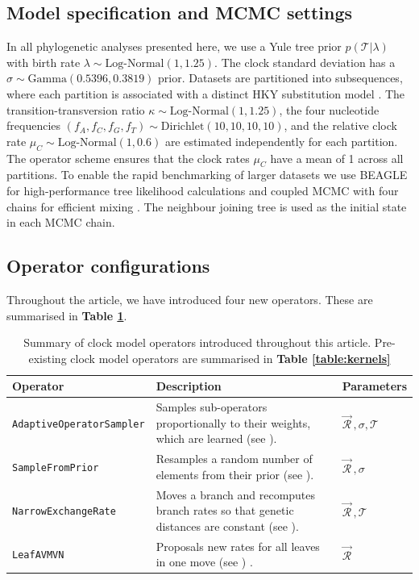 \documentclass[10pt,letterpaper]{article}
\begin{document}
\clearpage
\subsection*{Model specification and MCMC settings} \label{sect:methods}

In all phylogenetic analyses presented here, we use a Yule \cite{yule1925ii} tree prior $p(\mathcal{T}|\lambda)$ with birth rate $\lambda \sim \text{Log-Normal}(1,1.25)$.
The clock standard deviation has a $\sigma \sim \text{Gamma}(0.5396,0.3819)$ prior.
Datasets are partitioned into subsequences, where each partition is associated with a distinct HKY substitution model \cite{hasegawa1985dating}.
The transition-transversion ratio $\kappa \sim \text{Log-Normal}(1, 1.25)$, the four nucleotide frequencies $(f_A, f_C, f_G, f_T) \sim \text{Dirichlet}(10,10,10,10)$, and the relative clock rate $\mu_C \sim \text{Log-Normal}(1, 0.6)$ are estimated independently for each partition.
The operator scheme ensures that the clock rates $\mu_C$ have a mean of 1 across all partitions. 
To enable the rapid benchmarking of larger datasets we use BEAGLE for high-performance tree likelihood calculations \cite{ayres2012beagle} and coupled MCMC with four chains for efficient mixing \cite{muller2019coupled}.
The neighbour joining tree \cite{saitou1987neighbor} is used as the initial state in each MCMC chain.



\subsection*{Operator configurations} \label{sect:operatorSchemes}


Throughout the article, we have introduced four new operators. 
These are summarised in \textbf{Table \ref{table:newOperators}}.


\begin{table}[h!]
\centering
\begin{tabular}{l p{4cm} l} 
 Operator & Description & Parameters  \\
  \hline
 \texttt{AdaptiveOperatorSampler} & Samples sub-operators proportionally to their weights, which are learned (see \nameref{sect:adaptiveSampling}). & $\vec{\mathcal{R}}^{\,}, \sigma, \mathcal{T}$ \\
  \hline
 \texttt{SampleFromPrior} & Resamples a random number of elements from their prior (see \nameref{sect:adaptiveSampling}). & $\vec{\mathcal{R}}^{\,}, \sigma$ \\
  \hline
 \texttt{NarrowExchangeRate} & Moves a branch and recomputes branch rates so that genetic distances are constant (see \nameref{sect:NER}). & $\vec{\mathcal{R}}^{\,}, \mathcal{T}$\\
  \hline
 \texttt{LeafAVMVN}  & Proposals new rates for all leaves in one move (see \nameref{AVMVN_sect}) \cite{baele2017adaptive}. & $\vec{\mathcal{R}}^{\,}$ \\
\end{tabular}
\caption{Summary of clock model operators introduced throughout this article. Pre-existing clock model operators are summarised in \textbf{Table \ref{table:kernels}}}
\label{table:newOperators}
\end{table}
\end{document}
